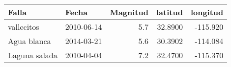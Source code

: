 \begin{tabular}{llrrr}
\toprule
        Falla &      Fecha &  Magnitud &  latitud &  longitud \\
\midrule
   vallecitos & 2010-06-14 &       5.7 &  32.8900 &  -115.920 \\
  Agua blanca & 2014-03-21 &       5.6 &  30.3902 &  -114.084 \\
Laguna salada & 2010-04-04 &       7.2 &  32.4700 &  -115.370 \\
\bottomrule
\end{tabular}
